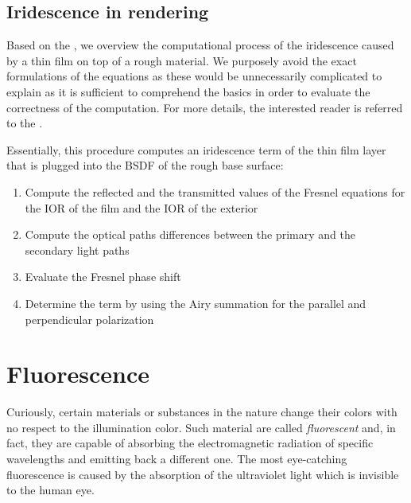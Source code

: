\subsection{Iridescence in rendering}

Based on the \citet{belcour2017practical}, we overview the computational process of the iridescence caused by a thin film on top of a rough material. We purposely avoid the exact formulations of the equations as these would be unnecessarily complicated to explain as it is sufficient to comprehend the basics in order to evaluate the correctness of the computation. For more details, the interested reader is referred to the \citet{belcour2017practical}.

Essentially, this procedure computes an iridescence term of the thin film layer that is plugged into the BSDF of the rough base surface:

\begin{enumerate}
	\item Compute the reflected and the transmitted values of the Fresnel equations for the IOR of the film and the IOR of the exterior
	\item Compute the optical paths differences between the primary and the secondary light paths
	\item Evaluate the Fresnel phase shift
	\item Determine the term by using the Airy summation for the parallel and perpendicular polarization
\end{enumerate}

\section{Fluorescence}

Curiously, certain materials or substances in the nature change their colors with no respect to the illumination color. Such material are called \emph{fluorescent} and, in fact, they are capable of absorbing the electromagnetic radiation of specific wavelengths and emitting back a different one. The most eye-catching fluorescence is caused by the absorption of the ultraviolet light which is invisible to the human eye.